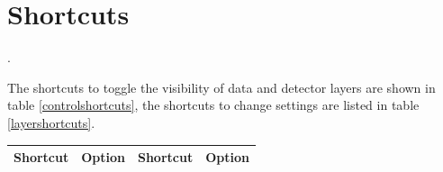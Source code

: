 \documentclass[a4paper,10pt]{article}
\begin{document}

\section{Shortcuts} 
\label{shortcuts}.


The shortcuts to toggle the visibility of data and detector layers are shown in table \ref{controlshortcuts}, the shortcuts to change settings are listed in table \ref{layershortcuts}.

\begin{center}
\begin{table}
 \begin{tabular}[ht]{|c|l||c|l|}
  \hline
  Shortcut & Option & Shortcut & Option\\
  \hline\hline


\end{tabular}
\end{table}
\end{center}
\end{document}
